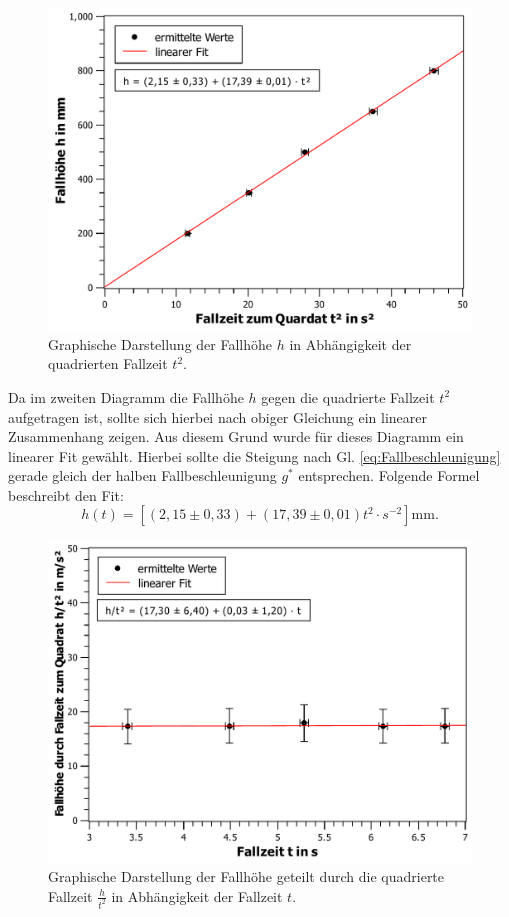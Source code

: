\begin{figure}[ht]
	\centering
	\includegraphics[width=\textwidth]{auswertung/h-gegen-t2.pdf}
	\caption{Graphische Darstellung der Fallhöhe $h$ in Abhängigkeit der quadrierten Fallzeit $t^2$.}
	\label{fig:hgegent2}	
\end{figure}	
Da im zweiten Diagramm die Fallhöhe $h$ gegen die quadrierte Fallzeit $t^2$ aufgetragen ist, sollte sich hierbei nach obiger Gleichung ein linearer Zusammenhang zeigen. Aus diesem Grund wurde für dieses Diagramm ein linearer Fit gewählt. Hierbei sollte die Steigung nach Gl. \ref{eq:Fallbeschleunigung} gerade gleich der halben Fallbeschleunigung $g^{*}$ entsprechen. Folgende Formel beschreibt den Fit:
\begin{equation*}
h(t) = [(2,15 \pm 0,33)+(17,39 \pm 0,01)t^2\cdot\si{s^{-2}}]\si{\mm}.
\end{equation*} 
\begin{figure}[ht]
	\centering
	\includegraphics[width=\textwidth]{auswertung/ht2-gegen-t.pdf}
	\caption{Graphische Darstellung der Fallhöhe geteilt durch die quadrierte Fallzeit $\frac{h}{t^2}$ in Abhängigkeit der Fallzeit $t$.}
	\label{fig:ht2gegent}	
\end{figure}
